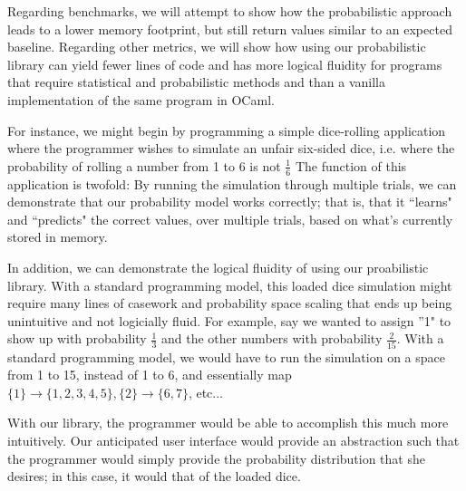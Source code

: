 \documentclass{sig-alternate}
\begin{document}
Regarding benchmarks, we will attempt to show how the probabilistic approach leads to 
a lower memory footprint, but still return values similar to an expected baseline. 
Regarding other metrics, we will show how using our probabilistic library can yield 
fewer lines of code and has more logical fluidity for programs that require statistical 
and probabilistic methods and than a vanilla implementation of the same program in OCaml. 

For instance, we might begin by programming a simple dice-rolling application where the programmer wishes
to simulate an unfair six-sided dice, i.e. where the probability of rolling a number from 1 to 6 is not $\frac{1}{6}$
The function of this application is twofold: By running the simulation through multiple trials, we can demonstrate 
that our probability model works correctly; that is, that it ``learns" and ``predicts" the correct values, over multiple trials,
based on what's currently stored in memory.

In addition, we can demonstrate the logical fluidity of using our proabilistic library.
With a standard programming model, this loaded dice simulation might require many lines of casework and probability space scaling
that ends up being unintuitive and not logicially fluid. For example, say we wanted to assign ''1" to show up with probability $\frac{1}{3}$
and the other numbers with probability $\frac{2}{15}$. With a standard programming model, we would have to run the simulation on a space from
1 to 15, instead of 1 to 6, and essentially map $\{1\} \rightarrow \{1, 2, 3, 4, 5\}, \{2\} \rightarrow \{6, 7\}$, etc...

With our library, the programmer would be able to accomplish this much more intuitively. Our
anticipated user interface would provide an abstraction such that the programmer would simply
provide the probability distribution that she desires; in this case, it would that of the loaded dice.

%
\end{document}
